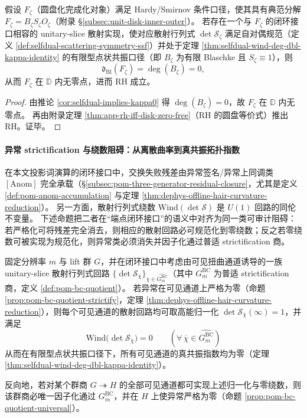 \begin{theorem}\label{thm:xi-selfdual-scattering-sufficient-rh}
假设 \(F_{\zeta}\)（圆盘化完成化对象）满足 Hardy/Smirnov 条件口径，使其具有典范分解 \(F_{\zeta}=B_{\zeta}S_{\zeta}O_{\zeta}\)（附录 \S\ref{subsec:unit-disk-inner-outer}）。
若存在一个与 \(F_{\zeta}\) 的闭环接口相容的 unitary-slice 散射实现，使对应散射行列式 \(\det\mathcal S_{\zeta}\) 满足自对偶规范（定义 \ref{def:selfdual-scattering-symmetry-ssf}）并处于定理 \ref{thm:selfdual-wind-deg-dbl-kappa-identity} 的有限型点状共振口径（即 \(B_{\zeta}\) 为有限 Blaschke 且 \(S_{\zeta}\equiv 1\)），则
\[
\mathfrak d_{\mathrm{Bl}}(F_{\zeta})=\deg(B_{\zeta})=0,
\]
从而 \(F_{\zeta}\) 在 \(\mathbb{D}\) 内无零点，进而 RH 成立。
\end{theorem}

\begin{proof}
由推论 \ref{cor:selfdual-implies-kappa0} 得 \(\deg(B_{\zeta})=0\)，故 \(F_{\zeta}\) 在 \(\mathbb{D}\) 内无零点。
再由附录定理 \ref{thm:app-rh-iff-disk-zero-free}（RH 的圆盘等价式）推出 RH。证毕。
\end{proof}

\paragraph{异常 strictification 与绕数阻碍：从离散曲率到真共振拓扑指数}
在本文投影词演算的闭环接口中，交换失败残差由异常签名/异常上同调类 \([\mathrm{Anom}]\) 完全承载（\S\ref{subsec:pom-three-generator-residual-closure}，尤其是定义 \ref{def:pom-anom-accumulation} 与定理 \ref{thm:dephys-offline-hair-curvature-reduction}）。
另一方面，散射行列式绕数 \(\mathrm{Wind}(\det\mathcal S)\) 是 \(U(1)\) 回路的同伦不变量。
下述命题把二者在“端点闭环接口”的语义中对齐为同一类可审计阻碍：若严格化可将残差完全消去，则相应的散射回路必可规范化到零绕数；反之若零绕数可被实现为规范化，则异常类必须消失并因子化通过普适 strictification 商。

\begin{theorem}\label{thm:xi-anom-winding-obstruction}
固定分辨率 \(m\) 与 lift 群 \(G\)，并在闭环接口中考虑由可见扭曲通道诱导的一族 unitary-slice 散射行列式回路 \(\{\det\mathcal S_{\overline\chi}\}_{\overline\chi\in\widehat{G^{\mathrm{BC}}_m}}\)（其中 \(G^{\mathrm{BC}}_m\) 为普适 strictification 商，定义 \ref{def:pom-bc-quotient}）。
若异常在可见通道上严格为零（命题 \ref{prop:pom-bc-quotient-strictify}，定理 \ref{thm:dephys-offline-hair-curvature-reduction}），则每个可见通道的散射回路均可取高能归一化 \(\det\mathcal S_{\overline\chi}(\infty)=1\)，并满足
\[
\boxed{\;
\mathrm{Wind}\bigl(\det\mathcal S_{\overline\chi}\bigr)=0\qquad(\forall\,\overline\chi\in\widehat{G^{\mathrm{BC}}_m})\;}
\]
从而在有限型点状共振口径下，所有可见通道的真共振指数均为零（定理 \ref{thm:selfdual-wind-deg-dbl-kappa-identity}）。
\par
反向地，若对某个群商 \(G\twoheadrightarrow H\) 的全部可见通道都可实现上述归一化与零绕数，则该群商必唯一因子化通过 \(G^{\mathrm{BC}}_m\)，并在 \(H\) 上使异常严格为零（命题 \ref{prop:pom-bc-quotient-universal}）。
\end{theorem}

